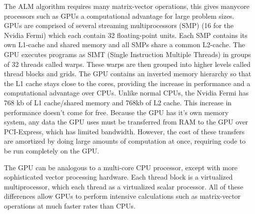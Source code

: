 \documentclass[10pt,twocolumn,letterpaper]{article}
\begin{document}
The ALM algorithm requires many matrix-vector operations, this gives manycore processors such as GPUs a computational advantage for large problem sizes.  GPUs are comprised of several streaming multiprocessors (SMP) (16 for the Nvidia Fermi) which each contain 32 floating-point units.  Each SMP contains its own L1-cache and shared memory and all SMPs share a common L2-cache.  The GPU executes programs as SIMT (Single Instruction Multiple Threads) in groups of 32 threads called warps.  These warps are then grouped into higher levels called thread blocks and grids. The GPU contains an inverted memory hierarchy so that the L1 cache stays close to the cores, providing the increase in performance and a computational advantage over CPUs.  Unlike normal CPUs, the Nvidia Fermi has 768 kb of L1 cache/shared memory and 768kb of L2 cache.  This increase in performance doesn't come for free.  Because the GPU has it's own memory system, any data the GPU uses must be transferred from RAM to the GPU over PCI-Express, which has limited bandwidth.  However, the cost of these transfers are amortized by doing large amounts of computation at once, requiring code to be run completely on the GPU.  

The GPU can be analogous to a multi-core CPU processor, except with more sophisticated vector processing hardware.  Each thread block is a virtualized multiprocessor, which each thread as a virtualized scalar processor.  All of these differences allow GPUs to perform intensive calculations such as matrix-vector operations at much faster rates than CPUs. 


\end{document}
